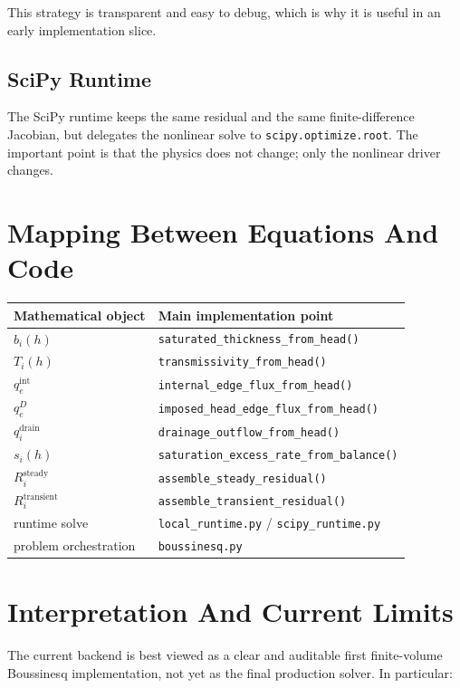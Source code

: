 \documentclass[11pt,a4paper]{article}
\begin{document}
This strategy is transparent and easy to debug, which is why it is useful in an
early implementation slice.

\subsection{SciPy Runtime}

The SciPy runtime keeps the same residual and the same finite-difference
Jacobian, but delegates the nonlinear solve to
\texttt{scipy.optimize.root}. The important point is that the physics does not
change; only the nonlinear driver changes.

\section{Mapping Between Equations And Code}

\begin{center}
\begin{tabular}{ll}
\toprule
Mathematical object & Main implementation point \\
\midrule
$b_i(h)$ & \texttt{saturated\_thickness\_from\_head()} \\
$T_i(h)$ & \texttt{transmissivity\_from\_head()} \\
$q^{\text{int}}_e$ & \texttt{internal\_edge\_flux\_from\_head()} \\
$q^{D}_e$ & \texttt{imposed\_head\_edge\_flux\_from\_head()} \\
$q_i^{\text{drain}}$ & \texttt{drainage\_outflow\_from\_head()} \\
$s_i(h)$ & \texttt{saturation\_excess\_rate\_from\_balance()} \\
$R_i^{\text{steady}}$ & \texttt{assemble\_steady\_residual()} \\
$R_i^{\text{transient}}$ & \texttt{assemble\_transient\_residual()} \\
runtime solve & \texttt{local\_runtime.py} / \texttt{scipy\_runtime.py} \\
problem orchestration & \texttt{boussinesq.py} \\
\bottomrule
\end{tabular}
\end{center}

\section{Interpretation And Current Limits}

The current backend is best viewed as a clear and auditable first finite-volume
Boussinesq implementation, not yet as the final production solver. In
particular:
\end{document}
